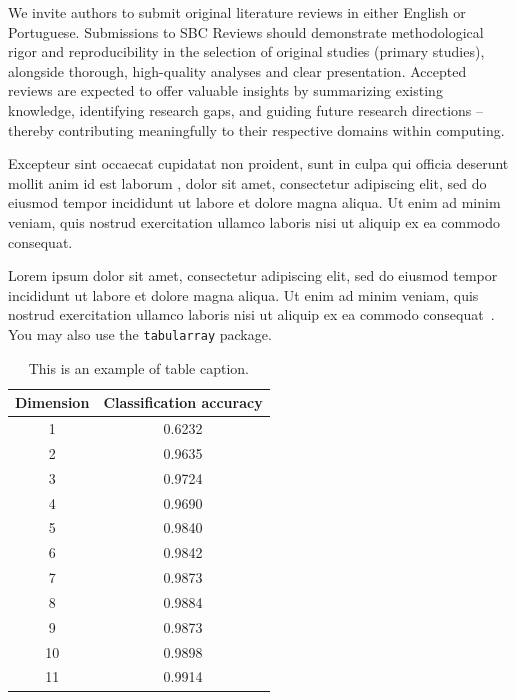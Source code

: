 \documentclass[english]{sbcreviews-2025}%
\begin{document}
We invite authors to submit original literature reviews in either English or Portuguese. Submissions to SBC Reviews should demonstrate methodological rigor and reproducibility in the selection of original studies (primary studies), alongside thorough, high-quality analyses and clear presentation. Accepted reviews are expected to offer valuable insights by summarizing existing knowledge, identifying research gaps, and guiding future research directions – thereby contributing meaningfully to their respective domains within computing.


Excepteur sint occaecat cupidatat non proident, sunt in culpa qui officia deserunt mollit anim id est laborum \citep{ref3}, dolor sit amet, consectetur adipiscing elit, sed do eiusmod tempor incididunt ut labore et dolore magna aliqua. Ut enim ad minim veniam, quis nostrud exercitation ullamco laboris nisi ut aliquip ex ea commodo consequat.

Lorem ipsum dolor sit amet, consectetur adipiscing elit, sed do eiusmod tempor incididunt ut labore et dolore magna aliqua. Ut enim ad minim veniam, quis nostrud exercitation ullamco laboris nisi ut aliquip ex ea commodo consequat~\citep{ref4}.
You may also use the \texttt{tabularray} package.

\begin{table}[!ht]
\caption{This is an example of table caption.}
\centering
\begin{tabular}{@{}cc@{}}
\hline\hline
Dimension & Classification accuracy \\
\hline%
 1  & 0.6232 \\
 2  & 0.9635 \\
 3  & 0.9724 \\
 4  & 0.9690 \\
 5  & 0.9840 \\
 6  & 0.9842 \\
 7  & 0.9873 \\
 8  & 0.9884 \\
 9  & 0.9873 \\
 10 & 0.9898 \\
 11 & 0.9914 \\
\hline\hline
\end{tabular}
\label{tab1}
\end{table}
\end{document}
